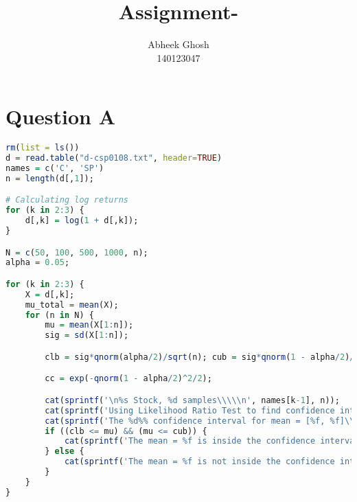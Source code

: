 \documentclass{article}
\begin{document}
	\title{\textbf{Assignment-}}
	\author{Abheek Ghosh \\ 
		140123047 }
	
	\maketitle
	

\section{Question A}


\begin{lstlisting}[language=R]
rm(list = ls())
d = read.table("d-csp0108.txt", header=TRUE)
names = c('C', 'SP')
n = length(d[,1]);

# Calculating log returns
for (k in 2:3) {
	d[,k] = log(1 + d[,k]);
}

N = c(50, 100, 500, 1000, n);
alpha = 0.05;

for (k in 2:3) {
	X = d[,k];
	mu_total = mean(X);
	for (n in N) {
		mu = mean(X[1:n]);
		sig = sd(X[1:n]);

		clb = sig*qnorm(alpha/2)/sqrt(n); cub = sig*qnorm(1 - alpha/2)/sqrt(n);

		cc = exp(-qnorm(1 - alpha/2)^2/2);

		cat(sprintf('\n%s Stock, %d samples\\\\\n', names[k-1], n));
		cat(sprintf('Using Likelihood Ratio Test to find confidence interval.\\\\\nHypothesis rejected if ratio less than %f\\\\\n', cc));
		cat(sprintf('The %d%% confidence interval for mean = [%f, %f]\\\\\n', 100*(1-alpha), clb, cub));
		if ((clb <= mu) && (mu <= cub)) {
			cat(sprintf('The mean = %f is inside the confidence interval.\\\\\n\n', mu));
		} else {
			cat(sprintf('The mean = %f is not inside the confidence interval.\\\\\n\n', mu));
		}
	}	
}

\end{lstlisting}
\end{document}
